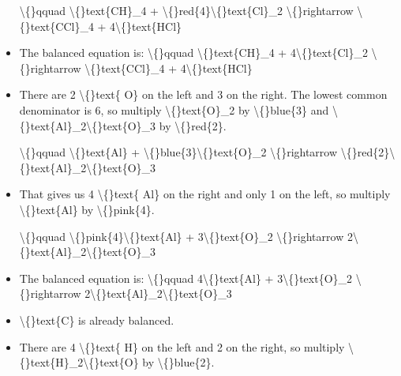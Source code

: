 \documentclass{article}
\begin{document}
\begin{itemize}
                    \textbackslash\{\}qquad
                        \textbackslash\{\}text\{CH\}\_4 + \textbackslash\{\}red\{4\}\textbackslash\{\}text\{Cl\}\_2 \textbackslash\{\}rightarrow \textbackslash\{\}text\{CCl\}\_4 + 4\textbackslash\{\}text\{HCl\}
  \item The balanced equation is:
                    \textbackslash\{\}qquad
                        \textbackslash\{\}text\{CH\}\_4 + 4\textbackslash\{\}text\{Cl\}\_2 \textbackslash\{\}rightarrow \textbackslash\{\}text\{CCl\}\_4 + 4\textbackslash\{\}text\{HCl\}
  \item There are 2 \textbackslash\{\}text\{ O\} on the left and
                        3 on the right. The lowest common denominator
                        is 6, so multiply
                        \textbackslash\{\}text\{O\}\_2 by \textbackslash\{\}blue\{3\} and
                        \textbackslash\{\}text\{Al\}\_2\textbackslash\{\}text\{O\}\_3 by \textbackslash\{\}red\{2\}.
                    
                    \textbackslash\{\}qquad
                        \textbackslash\{\}text\{Al\} + \textbackslash\{\}blue\{3\}\textbackslash\{\}text\{O\}\_2 \textbackslash\{\}rightarrow \textbackslash\{\}red\{2\}\textbackslash\{\}text\{Al\}\_2\textbackslash\{\}text\{O\}\_3
  \item That gives us 4 \textbackslash\{\}text\{ Al\} on the right and
                        only 1 on the left, so multiply
                        \textbackslash\{\}text\{Al\} by \textbackslash\{\}pink\{4\}.
                    
                    \textbackslash\{\}qquad
                        \textbackslash\{\}pink\{4\}\textbackslash\{\}text\{Al\} + 3\textbackslash\{\}text\{O\}\_2 \textbackslash\{\}rightarrow 2\textbackslash\{\}text\{Al\}\_2\textbackslash\{\}text\{O\}\_3
  \item The balanced equation is:
                    \textbackslash\{\}qquad
                        4\textbackslash\{\}text\{Al\} + 3\textbackslash\{\}text\{O\}\_2 \textbackslash\{\}rightarrow 2\textbackslash\{\}text\{Al\}\_2\textbackslash\{\}text\{O\}\_3
  \item \textbackslash\{\}text\{C\} is already balanced.
  \item There are 4 \textbackslash\{\}text\{ H\} on the left and
                        2 on the right, so multiply
                        \textbackslash\{\}text\{H\}\_2\textbackslash\{\}text\{O\} by \textbackslash\{\}blue\{2\}.
                    

\end{itemize}
\end{document}
